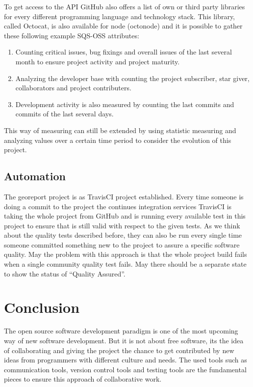 \documentclass[DIV=calc,paper=a4,fontsize=9pt,twocolumn]{scrartcl}
\begin{document}
To get access to the API GitHub also offers a list of own or third party libraries for every different programming language and technology stack. This library, called Octocat, is also available for node (octonode) and it is possible to gather these following example SQS-OSS attributes:

\begin{enumerate}
    \item Counting critical issues, bug fixings and overall issues of the last several month to ensure project activity and project maturity. 
    \item Analyzing the developer base with counting the project subscriber, star giver, collaborators and project contributers.
    \item Development activity is also measured by counting the last commits and commits of the last several days.
\end{enumerate}

This way of measuring can still be extended by using statistic measuring and analyzing values over a certain time period to consider the evolution of this project. 

\subsection{Automation}

The georeport project is as TravisCI project established. Every time someone is doing a commit to the project the continues integration services TravisCI is taking the whole project from GitHub and is running every available test in this project to ensure that is still valid with respect to the given tests. As we think about the quality tests described before, they can also be run every single time someone committed something new to the project to assure a specific software quality. May the problem with this approach is that the whole project build fails when a single community quality test fails. May there should be a separate state to show the status of \enquote{Quality Assured}.

\section{Conclusion}

The open source software development paradigm is one of the most upcoming way of new software development. But it is not about free software, its the idea of collaborating and giving the project the chance to get contributed by new ideas from programmers with different culture and needs. The used tools such as communication tools, version control tools and testing tools are the fundamental pieces to ensure this approach of collaborative work.
\end{document}
